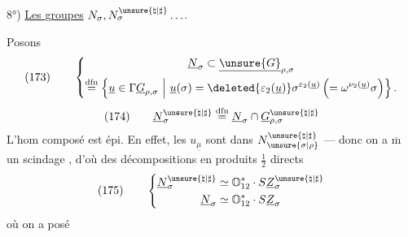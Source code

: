 
8°) \uline{Les groupes} \(N_\sigma,N_\sigma^{\unsure{\natural|\sharp}}\ldots\).

Posons
\[
(173)\qquad
\left\{
\begin{gathered}
\underline N_\sigma\subset\underline{\unsure{G}}_{\rho,\sigma}\\
\mathrel{\overset{\mathrm{dfn}}{=}}
\left\{\underline u\in\Gamma\underline G_{\rho,\sigma}\ \middle|\
\underline u(\sigma)=
\deleted{\varepsilon_2(\underline u)}
\sigma^{\varepsilon_2(\underline u)}
\left(=\omega^{\nu_2(\underline u)}\sigma\right)\right\}.
\end{gathered}
\right.
\]
\[
(174)\qquad
\underline N_\sigma^{\unsure{\natural|\sharp}}
\mathrel{\overset{\mathrm{dfn}}{=}}
\underline N_\sigma\cap\underline G_{\rho,\sigma}^{\unsure{\natural|\sharp}}
\]
L'hom composé
est épi. En effet, les \(u_{\underline\mu}\) sont dans
\(N_{\unsure{\sigma|\rho}}^{\unsure{\natural|\sharp}}\) --- donc on a $\overline{\mathrm m}$ un scindage
,
d'où des décompositions en produits \(\frac12\) directs
\[
(175)\qquad
\left\{
\begin{aligned}
\underline N_\sigma^{\unsure{\natural|\sharp}}
&\simeq\mathbb O_{12}^{*}\cdot S\underline Z_\sigma^{\unsure{\natural|\sharp}}\\
\underline N_\sigma
&\simeq\mathbb O_{12}^{*}\cdot S\underline Z_\sigma
\end{aligned}
\right.
\]
où on a posé
